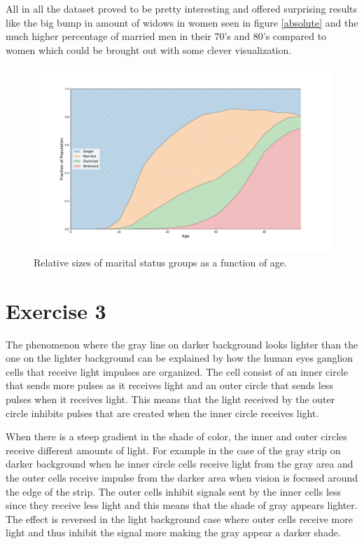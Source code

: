 \documentclass{article}
\begin{document}
All in all the dataset proved to be pretty interesting and offered surprising results like the big bump in amount of widows in women seen in figure \ref{absolute} and the much higher percentage of married men in their 70's and 80's compared to women which could be brought out with some clever visualization. 

\begin{figure}[h!]
	\centering
	\includegraphics[width = \linewidth]{cumulative}
	\caption{Relative sizes of marital status groups as a function of age.}
	\label{cumulative}
\end{figure}

\newpage

\section*{Exercise 3}

The phenomenon where the gray line on darker background looks lighter than the one on the lighter background can be explained by how the human eyes ganglion cells that receive light impulses are organized. The cell consist of an inner circle that sends more pulses as it receives light and an outer circle that sends less pulses when it receives light. This means that the light received by the outer circle inhibits pulses that are created when the inner circle receives light.

When there is a steep gradient in the shade of color, the inner and outer circles receive different amounts of light. For example in the case of the gray strip on darker background when he inner circle cells receive light from the gray area and the outer cells receive impulse from the darker area when vision is focused around the edge of the strip. The outer cells inhibit signals sent by the inner cells less since they receive less light and this means that the shade of gray appears lighter. The effect is reversed in the light background case where outer cells receive more light and thus inhibit the signal more making the gray appear a darker shade.
\end{document}
